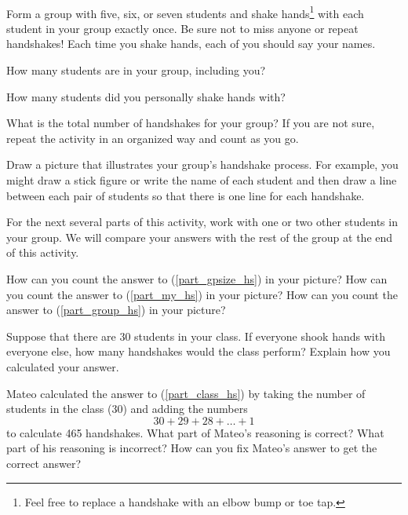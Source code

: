 \begin{act} 
\label{act_handshakes}    
~
    \begin{actpart}
        \item Form a group with five, six, or seven students and shake hands\footnote{Feel free to replace a handshake with an elbow bump or toe tap.} with each student in your group exactly once.  Be sure not to miss anyone or repeat handshakes! Each time you shake hands, each of you should say your names.
        
        \item \label{part_gpsize_hs} How many students are in your group, including you?
        
        \item \label{part_my_hs} How many students did you personally shake hands with?
        
        \item \label{part_group_hs} What is the total number of handshakes for your group?  If you are not sure, repeat the activity in an organized way and count as you go.
        
        \item Draw a picture that illustrates your group's handshake process.  For example, you might draw a stick figure or write the name of each student and then draw a line between each pair of students so that there is one line for each handshake.  
        
        \item For the next several parts of this activity, work with one or two other students in your group. We will compare your answers with the rest of the group at the end of this activity.
       
        How can you count the answer to (\ref{part_gpsize_hs}) in your picture? How can you count the answer to (\ref{part_my_hs}) in your picture?  How can you count the answer to (\ref{part_group_hs}) in your picture? 
        
        \item \label{part_class_hs} Suppose that there are 30 students in your class.  If everyone shook hands with everyone else, how many handshakes would the class perform? Explain how you calculated your answer.

        \item Mateo calculated the answer to (\ref{part_class_hs}) by taking the number of students in the class (30) and adding the numbers $$30+29+28+\ldots+1$$ to calculate 465 handshakes.  What part of Mateo's reasoning is correct?  What part of his reasoning is incorrect?  How can you fix Mateo's answer to get the correct answer?
        

\end{actpart}
\end{act}
